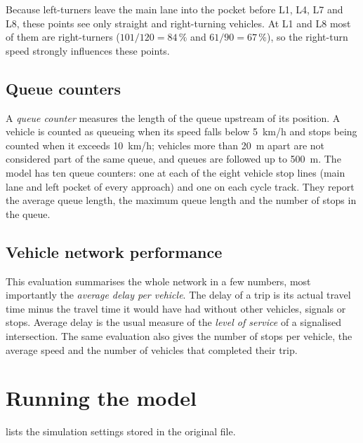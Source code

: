 \documentclass[11pt,a4paper]{article}
\newcommand{\kmh}{~km/h}
\begin{document}
Because left-turners leave the main lane into the pocket before L1, L4, L7 and L8, these points see
only straight and right-turning vehicles. At L1 and L8 most of them are right-turners
($101/120 = 84\,\%$ and $61/90 = 67\,\%$), so the right-turn speed strongly influences these points.

\subsection{Queue counters}

A \emph{queue counter} measures the length of the queue upstream of its position. A vehicle is
counted as queueing when its speed falls below 5\kmh{} and stops being counted when it exceeds
10\kmh{}; vehicles more than 20~m apart are not considered part of the same queue, and queues are
followed up to 500~m. The model has ten queue counters: one at each of the eight vehicle stop lines
(main lane and left pocket of every approach) and one on each cycle track. They report the average
queue length, the maximum queue length and the number of stops in the queue.

\subsection{Vehicle network performance}

This evaluation summarises the whole network in a few numbers, most importantly the \emph{average
delay per vehicle}. The delay of a trip is its actual travel time minus the travel time it would
have had without other vehicles, signals or stops. Average delay is the usual measure of the
\emph{level of service} of a signalised intersection. The same evaluation also gives the number of
stops per vehicle, the average speed and the number of vehicles that completed their trip.

\section{Running the model}
\label{sec:running}

 lists the simulation settings stored in the original file.
\end{document}
